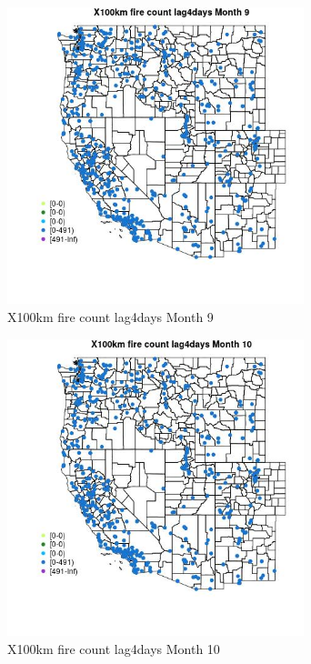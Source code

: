 \begin{figure} 
\centering  
\includegraphics[width=0.77\textwidth]{Code_Outputs/Report_ML_input_PM25_Step4_part_e_de_duplicated_aves_compiled_2019-05-14wNAs_MapObsMo9X100km_fire_count_lag4days.jpg} 
\caption{\label{fig:Report_ML_input_PM25_Step4_part_e_de_duplicated_aves_compiled_2019-05-14wNAsMapObsMo9X100km_fire_count_lag4days}X100km fire count lag4days Month 9} 
\end{figure} 
 

\clearpage 

\begin{figure} 
\centering  
\includegraphics[width=0.77\textwidth]{Code_Outputs/Report_ML_input_PM25_Step4_part_e_de_duplicated_aves_compiled_2019-05-14wNAs_MapObsMo10X100km_fire_count_lag4days.jpg} 
\caption{\label{fig:Report_ML_input_PM25_Step4_part_e_de_duplicated_aves_compiled_2019-05-14wNAsMapObsMo10X100km_fire_count_lag4days}X100km fire count lag4days Month 10} 
\end{figure} 
 

